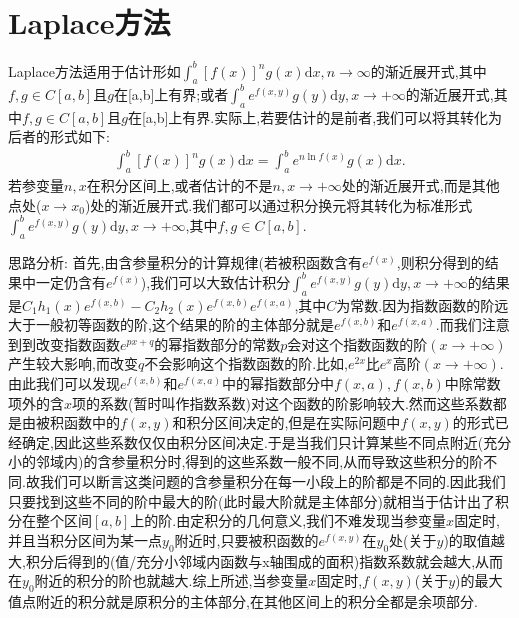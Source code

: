 \documentclass[../../main.tex]{subfiles}
\begin{document}
\section{Laplace方法}

Laplace方法适用于估计形如$\int_a^b{\left[ f\left( x \right) \right] ^ng\left( x \right) \mathrm{d}x},n\rightarrow \infty $的渐近展开式,其中$f,g\in C[a,b]$且$g$在[a,b]上有界;或者$\int_a^b{e^{f\left( x,y \right)}g(y)\mathrm{d}y},x\rightarrow +\infty $的渐近展开式,其中$f,g\in C[a,b]$且$g$在[a,b]上有界.实际上,若要估计的是前者,我们可以将其转化为后者的形式如下:
\begin{align*}
\int_a^b{\left[ f\left( x \right) \right] ^ng\left( x \right) \mathrm{d}x}=\int_a^b{e^{n\ln f\left( x \right)}g\left( x \right) \mathrm{d}x}.
\end{align*}
若参变量$n,x$在积分区间上,或者估计的不是$n,x\to +\infty$处的渐近展开式,而是其他点处($x\to x_0$)处的渐近展开式.我们都可以通过积分换元将其转化为标准形式$\int_a^b{e^{f\left( x,y \right)}g(y)\mathrm{d}y},x\rightarrow +\infty $,其中$f,g\in C[a,b]$.

思路分析:
首先,由含参量积分的计算规律(若被积函数含有$e^{f(x)}$,则积分得到的结果中一定仍含有$e^{f(x)}$),我们可以大致估计积分$\int_a^b{e^{f\left( x,y \right)}g(y)\mathrm{d}y},x\rightarrow +\infty $的结果是$C_1h_1\left( x \right) e^{f\left( x,b \right)}-C_2h_2\left( x \right) e^{f\left( x,b \right)}e^{f\left( x,a \right)} $,其中$C$为常数.因为指数函数的阶远大于一般初等函数的阶,这个结果的阶的主体部分就是$e^{f\left( x,b \right)}$和$e^{f\left( x,a \right)}$.而我们注意到到改变指数函数$e^{px+q}$的幂指数部分的常数$p$会对这个指数函数的阶$(x\to +\infty)$产生较大影响,而改变$q$不会影响这个指数函数的阶.比如,$e^{2x}$比$e^x$高阶$(x\to+\infty)$.由此我们可以发现$e^{f\left( x,b \right)}$和$e^{f\left( x,a \right)}$中的幂指数部分中$f(x,a),f(x,b)$中除常数项外的含$x$项的系数(暂时叫作指数系数)对这个函数的阶影响较大.然而这些系数都是由被积函数中的$f(x,y)$和积分区间决定的,但是在实际问题中$f(x,y)$的形式已经确定,因此这些系数仅仅由积分区间决定.于是当我们只计算某些不同点附近(充分小的邻域内)的含参量积分时,得到的这些系数一般不同,从而导致这些积分的阶不同.故我们可以断言这类问题的含参量积分在每一小段上的阶都是不同的.因此我们只要找到这些不同的阶中最大的阶(此时最大阶就是主体部分)就相当于估计出了积分在整个区间$[a,b]$上的阶.由定积分的几何意义,我们不难发现当参变量$x$固定时,并且当积分区间为某一点$y_0$附近时,只要被积函数的$e^{f(x,y)}$在$y_0$处(关于$y$)的取值越大,积分后得到的(值/充分小邻域内函数与x轴围成的面积)指数系数就会越大,从而在$y_0$附近的积分的阶也就越大.综上所述,当参变量$x$固定时,$f(x,y)$(关于$y$)的最大值点附近的积分就是原积分的主体部分,在其他区间上的积分全都是余项部分.
\end{document}
